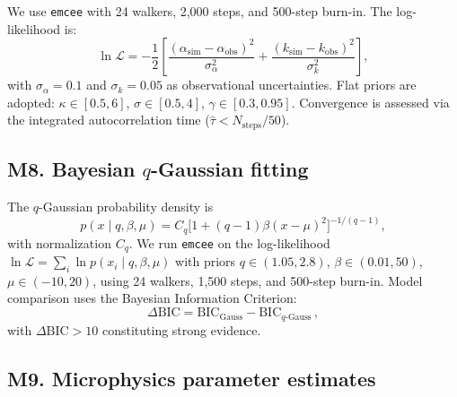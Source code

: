 We use \texttt{emcee}\cite{foremanmackey2013} with 24 walkers, 2{,}000 steps, and 500-step burn-in. The log-likelihood is:
\begin{equation}
\ln\mathcal{L} = -\frac{1}{2}\left[\frac{(\alpha_{\mathrm{sim}} - \alpha_{\mathrm{obs}})^2}{\sigma_\alpha^2} + \frac{(k_{\mathrm{sim}} - k_{\mathrm{obs}})^2}{\sigma_k^2}\right],
\tag{M6}
\label{eq:M6}
\end{equation}
with $\sigma_\alpha = 0.1$ and $\sigma_k = 0.05$ as observational uncertainties. Flat priors are adopted: $\kappa \in [0.5, 6]$, $\sigma \in [0.5, 4]$, $\gamma \in [0.3, 0.95]$. Convergence is assessed via the integrated autocorrelation time ($\hat{\tau} < N_{\mathrm{steps}}/50$).

\subsection*{M8. Bayesian $q$-Gaussian fitting}

The $q$-Gaussian probability density is
\begin{equation}
p(x \mid q, \beta, \mu) = C_q\bigl[1 + (q-1)\beta(x-\mu)^2\bigr]^{-1/(q-1)},
\tag{M7}
\label{eq:M7}
\end{equation}
with normalization $C_q$. We run \texttt{emcee} on the log-likelihood $\ln\mathcal{L} = \sum_i \ln p(x_i \mid q, \beta, \mu)$ with priors $q \in (1.05, 2.8)$, $\beta \in (0.01, 50)$, $\mu \in (-10, 20)$, using 24 walkers, 1{,}500 steps, and 500-step burn-in. Model comparison uses the Bayesian Information Criterion:
\begin{equation}
\Delta\mathrm{BIC} = \mathrm{BIC}_{\mathrm{Gauss}} - \mathrm{BIC}_{q\text{-Gauss}}\,,
\tag{M8}
\end{equation}
with $\Delta\mathrm{BIC} > 10$ constituting strong evidence\cite{kass1995}.

\subsection*{M9. Microphysics parameter estimates}

